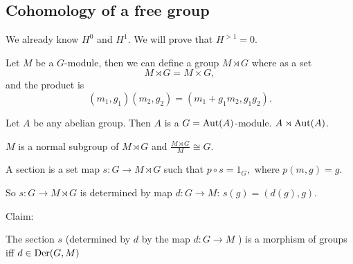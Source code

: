 \subsection*{Cohomology of a free group}
We already know $H^{0}$ and $H^{1}$.
We will prove that $H^{>1} = 0$.

\begin{definition}
Let $M$ be a  $G$-module, then we can define a group $M \rtimes G$ where as a set 
\[
M \rtimes  G = M \times G
,\] 
and the product is 
\[
    (m_1, g_1) (m_2,g_2) = (m_1 + g_1m_2, g_1g_2)
.\] 
\end{definition}
\begin{eg}
    Let $A$ be any abelian group.
    Then  $A$ is a  $G = \operatorname{Aut}(A)$-module.
    $A \rtimes \operatorname{Aut}(A)$.
\end{eg}

\begin{lemma}
$M$ is a normal subgroup of  $M \rtimes G$ and  $\frac{M \rtimes G}{M} \cong G$.
\end{lemma}

\begin{definition}
A section is a set map $s : G \to  M \rtimes G$ such that $ p  \circ  s  = 1_G ,$ where $p(m,g) = g$. 
\end{definition}
So $s: G \to  M \rtimes G$ is determined by map $d: G \to  M$: $s(g) = (d(g),g)$. 


Claim:
\begin{prop}
    The section $s$ (determined by  $d$ by the map  $d: G \to  M$ ) is a morphism of groups iff $d \in \operatorname{Der}(G, M)$
\end{prop}

